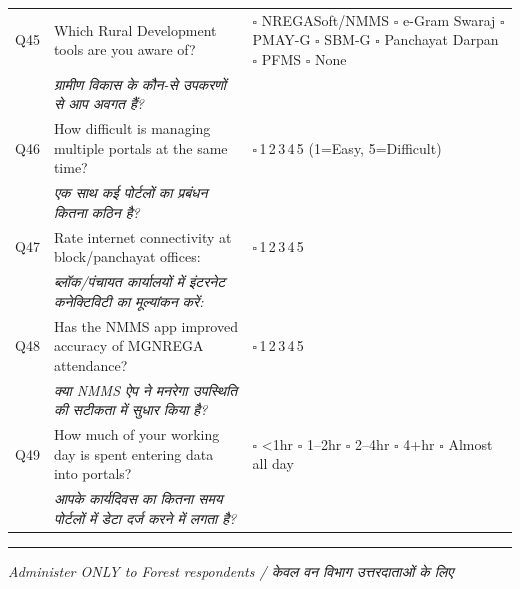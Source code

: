\documentclass[10pt,a4paper]{article}
\newcommand{\likert}{{\Large$\square$}\,1\quad{\Large$\square$}\,2\quad{\Large$\square$}\,3\quad{\Large$\square$}\,4\quad{\Large$\square$}\,5}
\begin{document}
\noindent\begin{tabularx}{\textwidth}{@{}L{0.8cm} X L{5.2cm}@{}}
Q45 & Which Rural Development tools are you aware of? & {\Large$\square$} NREGASoft/NMMS {\Large$\square$} e-Gram Swaraj {\Large$\square$} PMAY-G {\Large$\square$} SBM-G {\Large$\square$} Panchayat Darpan {\Large$\square$} PFMS {\Large$\square$} None \\
 & {\hindifont\small\itshape\color{black!70} ग्रामीण विकास के कौन-से उपकरणों से आप अवगत हैं?} & \\[3pt]
Q46 & How difficult is managing multiple portals at the same time? & \likert{} {\scriptsize(1=Easy, 5=Difficult)} \\
 & {\hindifont\small\itshape\color{black!70} एक साथ कई पोर्टलों का प्रबंधन कितना कठिन है?} & \\[3pt]
Q47 & Rate internet connectivity at block/panchayat offices: & \likert \\
 & {\hindifont\small\itshape\color{black!70} ब्लॉक/पंचायत कार्यालयों में इंटरनेट कनेक्टिविटी का मूल्यांकन करें:} & \\[3pt]
Q48 & Has the NMMS app improved accuracy of MGNREGA attendance? & \likert \\
 & {\hindifont\small\itshape\color{black!70} क्या NMMS ऐप ने मनरेगा उपस्थिति की सटीकता में सुधार किया है?} & \\[3pt]
Q49 & How much of your working day is spent entering data into portals? & {\Large$\square$} <1hr {\Large$\square$} 1--2hr {\Large$\square$} 2--4hr {\Large$\square$} 4+hr {\Large$\square$} Almost all day \\
 & {\hindifont\small\itshape\color{black!70} आपके कार्यदिवस का कितना समय पोर्टलों में डेटा दर्ज करने में लगता है?} & \\[3pt]
\end{tabularx}
\vspace{3pt}
\noindent\rule{\textwidth}{0.3pt}\vspace{3pt}
\vspace{3pt}

\small\textit{Administer ONLY to Forest respondents / {\hindifont केवल वन विभाग उत्तरदाताओं के लिए}}\vspace{3pt}
\end{document}
